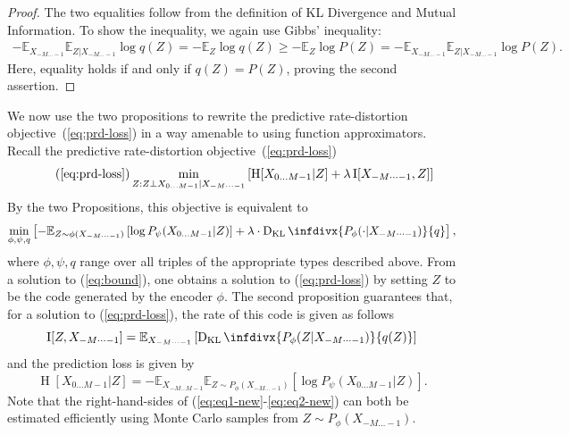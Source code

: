 \documentclass[entropy,article,submit,moreauthors,pdftex,10pt,a4paper]{Definitions/mdpi}
\newcommand{\finitefuture}{X_{0\dots M-1}}
\begin{document}
\begin{proof}
The two equalities follow from the definition of KL Divergence and Mutual Information. To show the inequality, we again use Gibbs' inequality:
\begin{align*}
    -\mathbb{E}_{X_{-M\dots-1}} \mathbb{E}_{Z|X_{-M\dots-1}} \log q(Z) = - \mathbb{E}_Z \log q(Z) \geq - \mathbb{E}_Z \log P(Z) = -\mathbb{E}_{X_{-M\dots-1}} \mathbb{E}_{Z|X_{-M\dots-1}} \log P(Z).
\end{align*}
Here, equality holds if and only if $q(Z) = P(Z)$, proving the second assertion.
\end{proof}

We now use the two propositions to rewrite the predictive rate-distortion objective~(\ref{eq:prd-loss}) in a way amenable to using function approximators.
Recall the predictive rate-distortion objective~(\ref{eq:prd-loss})
\begin{equation}\tag{\ref{eq:prd-loss}}
	\min_{Z : Z \bot \finitefuture | X_{-M\dots-1}}	\left[\operatorname{H}[\finitefuture | Z] + \lambda \operatorname{I}[ X_{-M\dots-1}, Z]\right]
\end{equation} %
By the two Propositions, this objective is equivalent to
\begin{equation}\label{eq:bound}
	\min_{\phi, \psi, q}	\left[-	\mathbb{E}_{Z \sim \phi(X_{-M\dots-1})}\left[\log P_\psi(\finitefuture | Z)\right] + \lambda \cdot \operatorname{D_{KL}}\infdivx{P_\phi(\cdot|X_{-M\dots-1})}{q}\right],
\end{equation} %
where $\phi, \psi, q$ range over all triples of the appropriate types described above.
From a solution to (\ref{eq:bound}), one obtains a solution to (\ref{eq:prd-loss}) by setting $Z$ to be the code generated by the encoder $\phi$.
The second proposition guarantees that, for a solution to  (\ref{eq:prd-loss}), the rate of this code is given as follows
\begin{equation}\label{eq:eq1-new}
 \operatorname{I}[Z, X_{-M\dots-1}] =   \mathbb{E}_{X_{-M\dots-1}}\left[ \operatorname{D_{KL}}\infdivx{P_\phi(Z|X_{-M\dots-1})}{q(Z)}\right]
\end{equation}
and the prediction loss is given by
\begin{equation}\label{eq:eq2-new}
  \operatorname{H}[\finitefuture|Z] =   - \mathbb{E}_{X_{-M\dots M-1}}	\mathbb{E}_{Z \sim P_\phi(X_{-M\dots-1})}\left[\log P_\psi(\finitefuture | Z)\right]. %
\end{equation}
Note that the right-hand-sides of (\ref{eq:eq1-new}-\ref{eq:eq2-new}) can both be estimated efficiently using Monte Carlo samples from $Z \sim P_\phi(X_{-M\dots-1})$.
\end{document}
